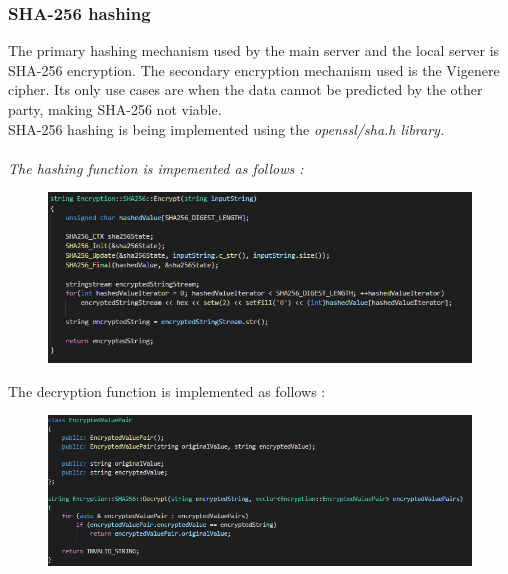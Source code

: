 \documentclass[runningheads]{llncs}
\begin{document}
\subsubsection{SHA-256 hashing}
The primary hashing mechanism used by the main server and the local server is SHA-256 encryption. The secondary encryption mechanism used is the Vigenere cipher. Its only use cases are when the data cannot be predicted by the other party, making SHA-256 not viable.\\
SHA-256 hashing is being implemented using the \it {openssl/sha.h} library.\\\\
The hashing function is impemented as follows :\\
\begin{figure}[H]
\centering
\includegraphics[width=150mm]{SHA-256_Encryption.png}
\end{figure}

The decryption function is implemented as follows :\\
\begin{figure}[H]
\centering
\includegraphics[width=150mm]{SHA-256_Decryption.png}
\end{figure}
\end{document}
